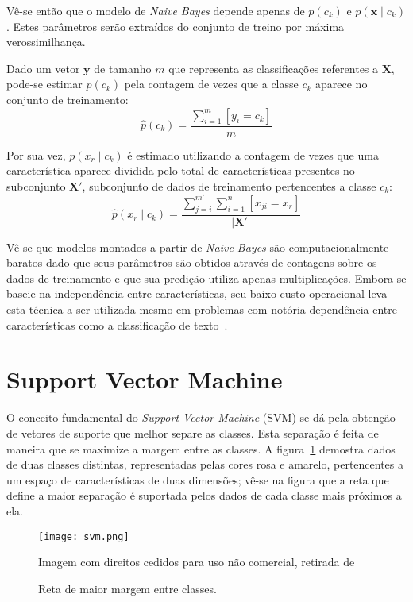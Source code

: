 Vê-se então que o modelo de \textit{Naive Bayes} depende apenas de $p(c_k)$ e $p(\mathbf{x} \mid c_k)$.
Estes parâmetros serão extraídos do conjunto de treino por máxima verossimilhança.

Dado um vetor $\mathbf{y}$ de tamanho $m$ que representa as classificações referentes a $\mathbf{X}$, pode-se estimar
$p(c_k)$ pela contagem de vezes que a classe $c_k$ aparece no conjunto de treinamento:
\begin{equation}
    \hat{p}(c_k) = \frac{\sum_{i=1}^m [y_i = c_k]}{m}
\end{equation}

Por sua vez, $p(x_r \mid c_k)$ é estimado utilizando a contagem de vezes que uma característica aparece dividida pelo
total de características presentes no subconjunto $\mathbf{X'}$, subconjunto de dados de treinamento pertencentes a
classe $c_k$:
\begin{equation}
    \hat{p}(x_r \mid c_k) = \frac{\sum_{j=i}^{m'} \sum_{i=1}^n [x_{ji} = x_r]}{|\mathbf{X'}|}
\end{equation}

Vê-se que modelos montados a partir de \textit{Naive Bayes} são computacionalmente baratos dado que seus parâmetros são
obtidos através de contagens sobre os dados de treinamento e que sua predição utiliza apenas multiplicações.
Embora se baseie na independência entre características, seu baixo custo operacional leva esta técnica a ser utilizada
mesmo em problemas com notória dependência entre características como a classificação de texto~\cite{mccallum98}.

\section{Support Vector Machine}

O conceito fundamental do \textit{Support Vector Machine} (SVM) se dá pela obtenção de vetores de suporte que melhor
separe as classes.
Esta separação é feita de maneira que se maximize a margem entre as classes.
A figura~\ref{fig:svm} demostra dados de duas classes distintas, representadas pelas cores rosa e amarelo, pertencentes
a um espaço de características de duas dimensões; vê-se na figura que a reta que define a maior separação é suportada
pelos dados de cada classe mais próximos a ela.

\begin{figure}
\begin{center} {
    \begin{center}
    \texttt{[image: svm.png]}
    \caption{Reta de maior margem entre classes.}
    \small Imagem com direitos cedidos para uso não comercial, retirada de~\cite{vanderplas15}
    \label{fig:svm}
    \end{center}
}
\end{center}
\end{figure}

